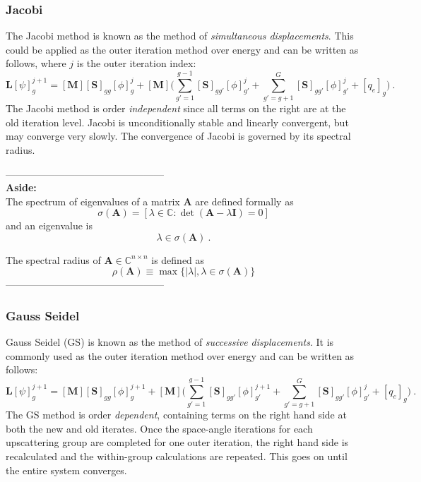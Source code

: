 \documentclass[12pt]{article}
\newcommand{\ve}[1]{\ensuremath{\mathbf{#1}}}
\begin{document}
\subsubsection*{Jacobi}
The Jacobi method is known as the method of \textit{simultaneous displacements}. %
This could be applied as the outer iteration method over energy and can be written as follows, where $j$ is the outer iteration index:
%
\begin{equation}
  \ve{L} [\psi]_{g}^{j+1} = [\ve{M}] [\ve{S}]_{gg}[\phi]_{g}^{j} +   [\ve{M}]\bigl(\sum_{g'=1}^{g-1} [\ve{S}]_{gg'}[\phi]_{g'}^{j} + \sum_{g'=g+1}^{G} [\ve{S}]_{gg'}[\phi]_{g'}^{j} + [q_{e}]_{g} \bigr) \label{eq:Jacobi} \:. 
\end{equation}
%
The Jacobi method is order \textit{independent} since all terms on the right are at the old iteration level. Jacobi is unconditionally stable and linearly convergent, but may converge very slowly. The convergence of Jacobi is governed by its spectral radius.%

------------------------------------------------\\
\textbf{Aside:}\\
The spectrum of eigenvalues of a matrix $\ve{A}$ are defined formally as
\[\sigma(\ve{A}) = [ \lambda \in \mathbb{C} : \det(\ve{A} - \lambda \ve{I})=0] \] 
and an eigenvalue is 
\[ \lambda \in \sigma(\ve{A})\:.\]

The spectral radius of $\ve{A} \in \mathbb{C}^{n \times n}$ is defined as 
\[\rho(\ve{A}) \equiv \max \lbrace |\lambda|, \lambda \in \sigma(\ve{A}) \rbrace\]
------------------------------------------------

\subsubsection*{Gauss Seidel}
Gauss Seidel (GS) is known as the method of \textit{successive displacements}. %
It is commonly used as the outer iteration method over energy and can be written as follows:
%
\begin{equation}
  \ve{L} [\psi]_{g}^{j+1} = [\ve{M}] [\ve{S}]_{gg}[\phi]_{g}^{j+1} +   [\ve{M}]\bigl(\sum_{g'=1}^{g-1} [\ve{S}]_{gg'}[\phi]_{g'}^{j+1} + \sum_{g'=g+1}^{G} [\ve{S}]_{gg'}[\phi]_{g'}^{j} + [q_{e}]_{g} \bigr) \label{eq:GaussSeidel} \:. 
\end{equation}
%
The GS method is order \textit{dependent}, containing terms on the right hand side at both the new and old iterates. Once the space-angle iterations for each upscattering group are completed for one outer iteration, the right hand side is recalculated and the within-group calculations are repeated. This goes on until the entire system converges.%
\end{document}
